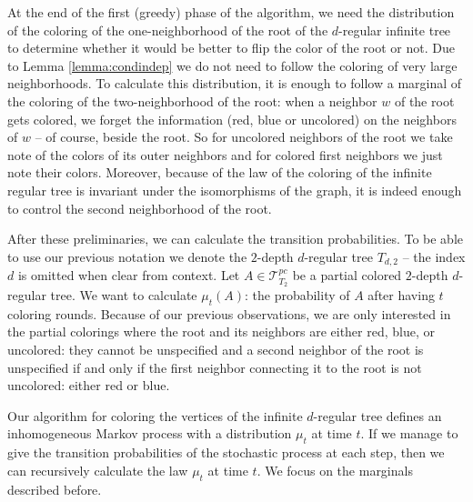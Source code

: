 \documentclass{article}
\theoremstyle{definition}
\begin{document}
At the end of the first (greedy) phase of the algorithm, we need the distribution of the coloring of the one-neighborhood of the root of the $d$-regular infinite tree to determine whether it would be better to flip the color of the root or not. Due to Lemma \ref{lemma:condindep} we do not need to follow the coloring of very large neighborhoods. To calculate this distribution, it is enough to follow a marginal of the coloring of the two-neighborhood of the root: when a neighbor $w$ of the root gets colored, we forget the information (red, blue or uncolored) on the neighbors of $w$ -- of course, beside the root. So for uncolored neighbors of the root we take note of the colors of its outer neighbors and for colored first neighbors we just note their colors. Moreover, because of the law of the coloring of the infinite regular tree is invariant under the isomorphisms of the graph, it is indeed enough to control the second neighborhood of the root.

After these preliminaries, we can calculate the transition probabilities. To be able to use our previous notation we denote the $2$-depth $d$-regular tree $T_{d,2}$ -- the index $d$ is omitted when clear from context. Let $A\in\mathcal T^{pc}_{T_2}$ be a partial colored $2$-depth $d$-regular tree. We want to calculate $\mu_t(A)$: the probability of $A$ after having $t$ coloring rounds. Because of our previous observations, we are only interested in the partial colorings where the root and its neighbors are either red, blue, or uncolored: they cannot be unspecified and a second neighbor of the root is unspecified if and only if the first neighbor connecting it to the root is not uncolored: either red or blue.

Our algorithm for coloring the vertices of the infinite $d$-regular tree defines an inhomogeneous Markov process with a distribution $\mu_t$ at time $t$.  If we manage to give the transition probabilities of the stochastic process at each step, then we can recursively calculate the law $\mu_t$ at time $t.$ We focus on the marginals described before.
\end{document}
